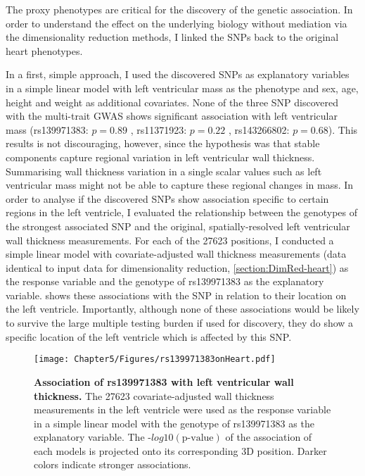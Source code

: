 The proxy phenotypes are critical for the discovery of the genetic association. In order to understand the effect on the underlying biology without mediation via the dimensionality reduction methods, I linked the SNPs back to the original heart phenotypes.

In a first, simple approach, I used the discovered SNPs as explanatory variables in a simple linear model with left ventricular mass as the phenotype and sex, age, height and weight as additional covariates. None of the three SNP discovered with the multi-trait GWAS shows significant association with left ventricular mass (rs139971383: \(p=0.89\) , rs11371923: \(p=0.22\) , rs143266802: \(p=0.68\)). This results is not discouraging, however, since the hypothesis was that stable components capture regional variation in left ventricular wall thickness. Summarising wall thickness variation in a single scalar values such as left ventricular mass might not be able to capture these regional changes in mass. In order to analyse if the discovered SNPs show association specific to certain regions in the left ventricle, I evaluated the relationship between the genotypes of the strongest associated SNP and the original, spatially-resolved left ventricular wall thickness measurements. 
For each of the \num{27623} positions, I conducted a simple linear model with covariate-adjusted wall thickness measurements (data identical to input data for dimensionality reduction, \cref{section:DimRed-heart}) as the response variable and the genotype of rs139971383 as the explanatory variable.  shows these associations with the SNP in relation to their location on the left ventricle. Importantly, although none of these associations would be likely to survive the large multiple testing burden if used for discovery, they do show a specific location of the left ventricle which is affected by this SNP.

\begin{figure}[hbtp]
	\centering
	\texttt{[image: Chapter5/Figures/rs139971383onHeart.pdf]}
	\caption[\textbf{Association of  rs139971383 with left ventricular wall thickness. } Plot generated with ParaView.]{\textbf{Association of rs139971383 with left ventricular wall thickness. }The \num{27623} covariate-adjusted wall thickness measurements in the left ventricle were used as the response variable in a simple linear model with the genotype of rs139971383 as the explanatory variable. The -\(log10(\text{p-value})\) of the association of each models is projected onto its corresponding 3D position. Darker colors indicate stronger associations. } 
	 	\label{fig:wall-heart}
\end{figure}


